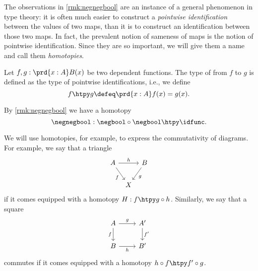 The observations in \cref{rmk:negnegbool} are an instance of a general phenomenon in type theory: it is often much easier to construct a \emph{pointwise identification} between the values of two maps, than it is to construct an identification between those two maps. In fact, the prevalent notion of sameness of maps is the notion of pointwise identification. Since they are so important, we will give them a name and call them \emph{homotopies}.

\begin{defn}
Let $f,g:\prd{x:A}B(x)$ be two dependent functions. The type of  from $f$ to $g$ is defined as the type of pointwise identifications, i.e., we define
\begin{equation*}
f\htpy g \defeq \prd{x:A} f(x)=g(x).
\end{equation*}
\end{defn}

\begin{eg}
  By \cref{rmk:negnegbool} we have a homotopy
  \begin{equation*}
    \negnegbool : \negbool\circ\negbool\htpy\idfunc.
  \end{equation*}
\end{eg}

\begin{rmk}\label{rmk:commuting-diagrams}
  We will use homotopies, for example, to express the commutativity of diagrams. For example, we say that a triangle
  \begin{equation*}
    \begin{tikzcd}[column sep=tiny]
      A \arrow[rr,"h"] \arrow[dr,swap,"f"] & & B \arrow[dl,"g"] \\
      & X
    \end{tikzcd}
  \end{equation*}
   if it comes equipped with a homotopy $H:f\htpy g\circ h$. Similarly, we say that a square
  \begin{equation*}
    \begin{tikzcd}
      A \arrow[r,"g"] \arrow[d,swap,"f"] & A' \arrow[d,"{f'}"] \\
      B \arrow[r,swap,"h"] & B'
    \end{tikzcd}
  \end{equation*}
  commutes if it comes equipped with a homotopy $h \circ f\htpy f'\circ g$.
\end{rmk}

